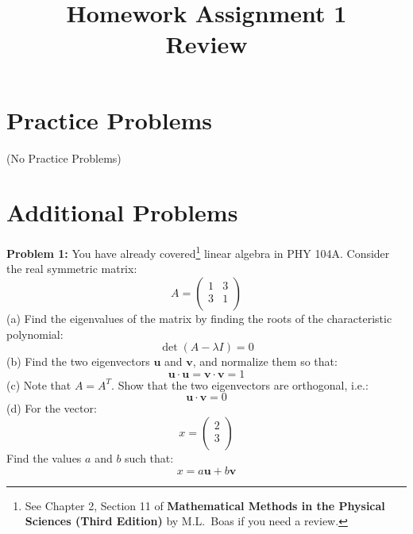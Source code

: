 \documentclass[12pt]{article}
\begin{document}

\date{\vspace{-5ex}}

\title{Homework Assignment 1 \\ Review}

\maketitle

\section*{Practice Problems}

(No Practice Problems)

\section*{Additional Problems}

\vskip 1cm
\noindent
{\bf Problem 1:}  You have already covered\footnote{See Chapter 2, Section 11 of {\bf Mathematical Methods in the Physical Sciences (Third Edition)} by M.L.~Boas if you need a review.} linear algebra in PHY 104A.  Consider the real symmetric matrix:
\begin{displaymath}
  A =
  \begin{pmatrix}
    1 & 3 \\
    3 & 1 \\
  \end{pmatrix}
\end{displaymath}
(a) Find the eigenvalues of the matrix by finding the roots of the characteristic polynomial:
\begin{displaymath}
\det \left(A - \lambda I \right) = 0
\end{displaymath}  
(b) Find the two eigenvectors $\textbf{u}$ and $\textbf{v}$, and normalize them so that:
\begin{displaymath}
\textbf{u} \cdot \textbf{u} = \textbf{v} \cdot \textbf{v} = 1
\end{displaymath}  
(c) Note that $A=A^T$.  Show that the two eigenvectors are orthogonal, i.e.:
\begin{displaymath}
\textbf{u} \cdot \textbf{v} = 0
\end{displaymath}  
(d) For the vector:
\begin{displaymath}
  x =
    \begin{pmatrix}
    2 \\
    3 \\
  \end{pmatrix}
\end{displaymath}  
Find the values $a$ and $b$ such that:
\begin{displaymath}
x = a \textbf{u} + b \textbf{v}
\end{displaymath}  
\end{document}
